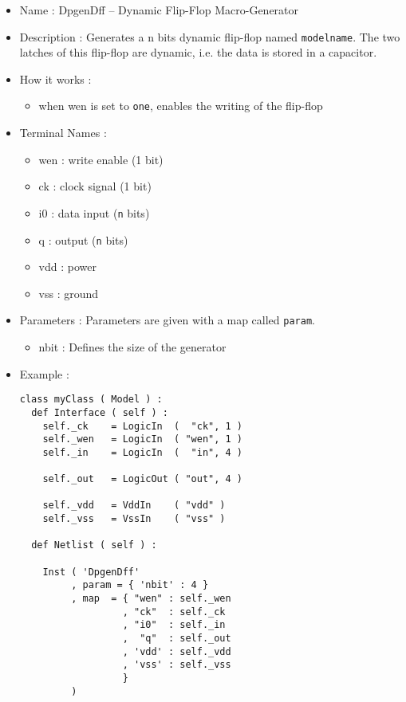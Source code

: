 \begin{itemize}
    \item Name : DpgenDff -- Dynamic Flip-Flop Macro-Generator
    \item Description : Generates a n bits dynamic flip-flop named \verb-modelname-. The two latches of this flip-flop are dynamic, i.e. the data is stored in a capacitor.
    \item How it works : 
    \begin{itemize}
        \item  when wen is set to \verb-one-, enables the writing of the flip-flop
    \end{itemize}
    \item Terminal Names :
    \begin{itemize}
        \item wen : write enable (1 bit)
        \item ck : clock signal (1 bit)
        \item i0 : data input (\verb-n- bits)
        \item q : output (\verb-n- bits)
        \item vdd : power
        \item vss : ground
    \end{itemize}
    \item Parameters : Parameters are given with a map called \verb-param-.
    \begin{itemize}
        \item nbit : Defines the size of the generator
    \end{itemize}
    \item Example :
\begin{verbatim}
class myClass ( Model ) :
  def Interface ( self ) :
    self._ck    = LogicIn  (  "ck", 1 )
    self._wen   = LogicIn  ( "wen", 1 )
    self._in    = LogicIn  (  "in", 4 )
    
    self._out   = LogicOut ( "out", 4 )

    self._vdd   = VddIn    ( "vdd" )
    self._vss   = VssIn    ( "vss" )
    
  def Netlist ( self ) :
      
    Inst ( 'DpgenDff'
         , param = { 'nbit' : 4 }
         , map  = { "wen" : self._wen
                  , "ck"  : self._ck
                  , "i0"  : self._in
                  ,  "q"  : self._out
                  , 'vdd' : self._vdd
                  , 'vss' : self._vss
                  }
         )
\end{verbatim}
\end{itemize}
